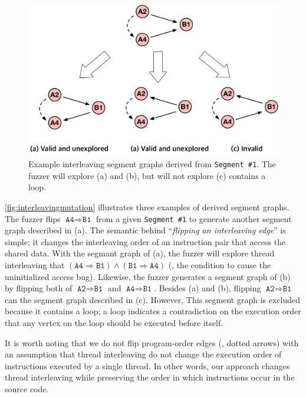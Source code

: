\begin{figure}[t]
  \centering
  \includegraphics[width=0.9\linewidth]{fig/interleavingmutation.pdf}
  \caption{Example interleaving segment graphs derived from
    \texttt{Segment \#1}. The fuzzer will explore (a) and (b), but
    will not explore (c) contains a loop.}
  \label{fig:interleavingmutation}
\end{figure}
%

\autoref{fig:interleavingmutation} illustrates three examples of
derived segment graphs.
%
The fuzzer flips $\texttt{A4} \Rightarrow \texttt{B1}$ from a given
\texttt{Segment \#1} to generate another segment graph described in
(a).
%
The semantic behind ``\textit{flipping an interleaving edge}'' is
simple; it changes the interleaving order of an instruction pair that
access the shared data.
%
With the segmant graph of (a), the fuzzer will explore thread
interleaving that
$(\texttt{A4} \Rightarrow \texttt{B1}) \wedge (\texttt{B1} \Rightarrow
\texttt{A4})$ (\ie, the condition to cause the uninitialized access
bug).
%
Likewise, the fuzzer generates a segment graph of (b) by flipping both
of $\texttt{A2} \Rightarrow \texttt{B1}$ and
$\texttt{A4} \Rightarrow \texttt{B1}$.
%
Besides (a) and (b), flipping $\texttt{A2} \Rightarrow \texttt{B1}$
can the segment graph described in (c). However, This segment graph is
excluded because it contains a loop; a loop indicates a contradiction
on the execution order that any vertex on the loop should be executed
before itself.


It is worth noting that we do not flip program-order edges (\ie,
dotted arrows) with an assumption that thread interleaving do not
change the execution order of instructions executed by a single
thread.
%
In other words, our approach changes thread interleaving while
preserving the order in which instructions occur in the source code.



